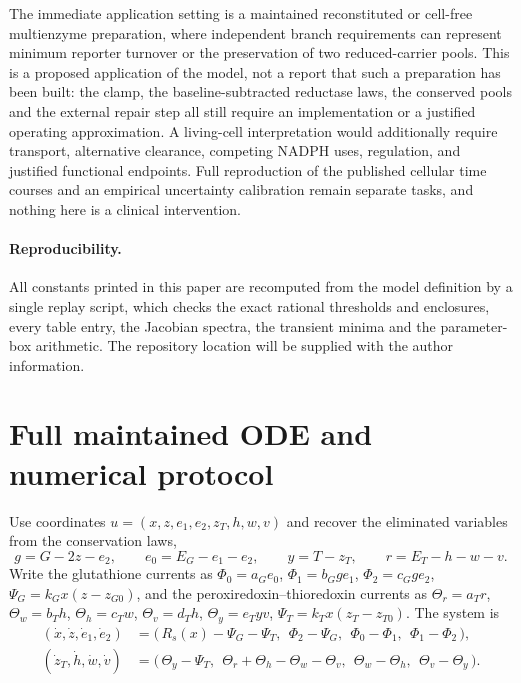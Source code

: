 \documentclass[11pt,a4paper]{article}
\newcommand{\RepositoryNote}{The repository location will be supplied with the author information.}
\theoremstyle{plain}
\theoremstyle{definition}
\theoremstyle{remark}
\begin{document}
The immediate application setting is a maintained reconstituted or cell-free
multienzyme preparation, where independent branch requirements can represent
minimum reporter turnover or the preservation of two reduced-carrier pools. This
is a proposed application of the model, not a report that such a preparation has
been built: the clamp, the baseline-subtracted reductase laws, the conserved pools
and the external repair step all still require an implementation or a justified
operating approximation. A living-cell interpretation would additionally require
transport, alternative clearance, competing NADPH uses, regulation, and justified
functional endpoints. Full reproduction of the published cellular time courses and
an empirical uncertainty calibration remain separate tasks, and nothing here is a
clinical intervention.

\paragraph{Reproducibility.}
All constants printed in this paper are recomputed from the model definition by a
single replay script, which checks the exact rational thresholds and enclosures,
every table entry, the Jacobian spectra, the transient minima and the parameter-box
arithmetic. \RepositoryNote

\appendix

\section{Full maintained ODE and numerical protocol}\label{app:ode}

Use coordinates $u=(x,z,e_1,e_2,z_T,h,w,v)$ and recover the eliminated variables
from the conservation laws,
\[
  g=G-2z-e_2,\qquad e_0=E_G-e_1-e_2,\qquad y=T-z_T,\qquad r=E_T-h-w-v .
\]
Write the glutathione currents as
$\Phi_0=a_Ge_0$, $\Phi_1=b_Gge_1$, $\Phi_2=c_Gge_2$, $\Psi_G=k_Gx(z-z_{G0})$, and
the peroxiredoxin--thioredoxin currents as
$\Theta_r=a_Tr$, $\Theta_w=b_Th$, $\Theta_h=c_Tw$, $\Theta_v=d_Th$,
$\Theta_y=e_Tyv$, $\Psi_T=k_Tx(z_T-z_{T0})$. The system is
\begin{equation}\label{eq:ode}
\begin{aligned}
  (\dot x,\dot z,\dot e_1,\dot e_2)
    &=\bigl(\,R_s(x)-\Psi_G-\Psi_T,\ \ \Phi_2-\Psi_G,\ \ \Phi_0-\Phi_1,\ \
      \Phi_1-\Phi_2\,\bigr),\\
  (\dot z_T,\dot h,\dot w,\dot v)
    &=\bigl(\,\Theta_y-\Psi_T,\ \
      \Theta_r+\Theta_h-\Theta_w-\Theta_v,\ \ \Theta_w-\Theta_h,\ \
      \Theta_v-\Theta_y\,\bigr).
\end{aligned}
\end{equation}
\end{document}
